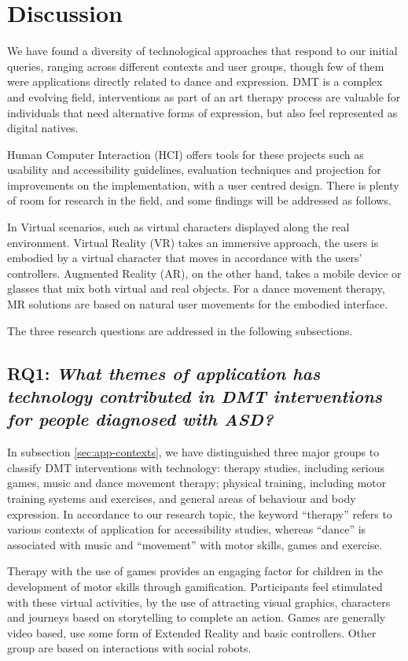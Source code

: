\documentclass[a4paper,fleqn]{cas-sc}
\begin{document}
\section{Discussion} 
\label{sec5:discussion}
We have found a diversity of technological approaches that respond to our initial queries, ranging across different contexts and user groups, though few of them were applications directly related to dance and expression. DMT is a complex and evolving field, interventions as part of an art therapy process are valuable for individuals that need alternative forms of expression, but also feel represented as digital natives.

Human Computer Interaction (HCI) offers tools for these projects such as usability and accessibility guidelines, evaluation techniques and projection for improvements on the implementation, with a user centred design. There is plenty of room for research in the field, and some findings will be addressed as follows.

In Virtual scenarios, such as virtual characters displayed along the real environment. Virtual Reality (VR) takes an immersive approach, the users is embodied by a virtual character that moves in accordance with the users’ controllers. Augmented Reality (AR), on the other hand, takes a mobile device or glasses that mix both virtual and real objects. For a dance movement therapy, MR solutions are based on natural user movements for the embodied interface.

The three research questions are addressed in the following subsections.

\subsection{RQ1: \emph{What themes of application has technology contributed in DMT interventions for people diagnosed with ASD?}}

In subsection \ref{sec:app-contexts}, we have distinguished three major groups to classify DMT interventions with technology: therapy studies, including serious games, music and dance movement therapy; physical training, including motor training systems and exercises, and general areas of behaviour and body expression.
In accordance to our research topic, the keyword ``therapy'' refers to various contexts of application for accessibility studies, whereas ``dance'' is associated with music and ``movement'' with motor skills, games and exercise.


Therapy with the use of games provides an engaging factor for children in the development of motor skills through gamification. Participants feel stimulated with these virtual activities, by the use of attracting visual graphics, characters and journeys based on storytelling to complete an action. Games are generally video based, use some form of Extended Reality and basic controllers. Other group are based on interactions with social robots.
\end{document}
